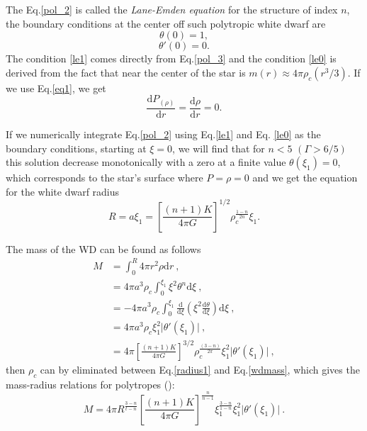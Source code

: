 \documentclass[oneside,a4paper,11pt]{report}
\begin{document}
The Eq.\eqref{pol_2} is called the \textit{Lane-Emden equation} for the structure of index $n$, the boundary 
conditions at the center off such polytropic white dwarf are
\begin{equation}
\label{le1}
 \theta(0) = 1, 
\end{equation}
\begin{equation}
\label{le0}
 \theta'(0)= 0.
\end{equation}
The condition \eqref{le1} comes directly from Eq.\eqref{pol_3} and the condition \eqref{le0} is derived from the fact 
that near the center of the star is $m(r) \approx 4\pi \rho_c (r^3/3)$. If we use Eq.\eqref{eq1}, we get
\begin{equation}
 \frac{\mathrm{d}P_{(\rho)}}{\mathrm{d}r} = \frac{\mathrm{d}\rho}{\mathrm{d}r} = 0 .
\end{equation}

If we numerically integrate Eq.\eqref{pol_2} using Eq.\eqref{le1} and Eq. \eqref{le0} as the boundary conditions, 
starting at $\xi=0$, we will find that for $n<5$ $(\Gamma>6/5)$ this solution decrease monotonically with a zero 
at a finite value $\theta(\xi_1) = 0$, which corresponds to the star's surface where $P=\rho = 0$ and we get the 
equation for the white dwarf radius 
\begin{equation}
 \label{radius1}
R = a\xi_1 = \left[ \frac{(n+1)K}{4\pi G} \right]^{1/2}\rho_c^{\frac{1-n}{2n}}\xi_1.
\end{equation}

The mass of the WD can be found as follows
\begin{equation}
 \label{wdmass}
\begin{split}
M &= \int_{0}^{R} 4\pi r^2 \rho \mathrm{d}r \:, \\
  &= 4 \pi a^3 \rho_c \int_{0}^{\xi_1} \xi^2 \theta^n \mathrm{d}\xi\:, \\
  &= -4 \pi a^3 \rho_c \int_{0}^{\xi_1}\frac{\mathrm{d}}{\mathrm{d}\xi}\left( \xi^2 \frac{\mathrm{d}\theta}{\mathrm{d}\xi}\right)\mathrm{d}\xi\:, \\
  &= 4 \pi a^3 \rho_c \xi_1^2 \lvert \theta' (\xi_1) \lvert\:, \\
  & = 4 \pi \left[ \frac{(n+1)K}{4 \pi G}\right]^{3/2} \rho_c^{\frac{(3-n)}{2\pi}}\xi_1^2 \lvert \theta' (\xi_1)\lvert \:,
\end{split}
\end{equation}
then $\rho_c$ can by eliminated between Eq.\eqref{radius1} and Eq.\eqref{wdmass}, which gives the mass-radius relations 
for polytropes (\citet{2004bhwd.book.....S}):  
\begin{equation}
\label{mr_eq}
 M = 4 \pi R^{\frac{3-n}{t-n}}\left[ \frac{(n+1)K}{4 \pi G}\right]^{\frac{n}{n-1}}
\xi_1^{\frac{3-n}{1-n}}\xi_1^2\lvert\theta' (\xi_1) \lvert \: .
\end{equation}
\end{document}
